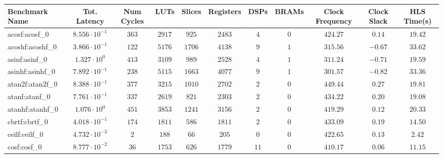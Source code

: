 \begin{tabular}{|l|c|c|c|c|c|c|c|c|c|c|}
\hline
Benchmark Name               & Tot. Latency            & Num Cycles & LUTs      & Slices    & Registers & DSPs    & BRAMs & Clock Frequency & Clock Slack & HLS Time(s) \\
\hline
acosf:acosf\_0               & $ 8.556 \cdot 10^{-1} $ & $ 363    $ & $ 2917  $ & $ 925   $ & $ 2483  $ & $ 4   $ & $ 0 $ & $ 424.27      $ & $ 0.14    $ & $ 19.42   $ \\
acoshf:acoshf\_0             & $ 3.866 \cdot 10^{-1} $ & $ 122    $ & $ 5176  $ & $ 1706  $ & $ 4138  $ & $ 9   $ & $ 1 $ & $ 315.56      $ & $ -0.67   $ & $ 33.62   $ \\
asinf:asinf\_0               & $ 1.327 \cdot 10^{0}  $ & $ 413    $ & $ 3109  $ & $ 989   $ & $ 2528  $ & $ 4   $ & $ 1 $ & $ 311.24      $ & $ -0.71   $ & $ 19.59   $ \\
asinhf:asinhf\_0             & $ 7.892 \cdot 10^{-1} $ & $ 238    $ & $ 5115  $ & $ 1663  $ & $ 4077  $ & $ 9   $ & $ 1 $ & $ 301.57      $ & $ -0.82   $ & $ 33.36   $ \\
atan2f:atan2f\_0             & $ 8.388 \cdot 10^{-1} $ & $ 377    $ & $ 3215  $ & $ 1010  $ & $ 2702  $ & $ 2   $ & $ 0 $ & $ 449.44      $ & $ 0.27    $ & $ 19.81   $ \\
atanf:atanf\_0               & $ 7.761 \cdot 10^{-1} $ & $ 337    $ & $ 2619  $ & $ 821   $ & $ 2303  $ & $ 2   $ & $ 0 $ & $ 434.22      $ & $ 0.20    $ & $ 19.08   $ \\
atanhf:atanhf\_0             & $ 1.076 \cdot 10^{0}  $ & $ 451    $ & $ 3853  $ & $ 1241  $ & $ 3156  $ & $ 2   $ & $ 0 $ & $ 419.29      $ & $ 0.12    $ & $ 20.33   $ \\
cbrtf:cbrtf\_0               & $ 4.018 \cdot 10^{-1} $ & $ 174    $ & $ 1811  $ & $ 586   $ & $ 1811  $ & $ 2   $ & $ 0 $ & $ 433.09      $ & $ 0.19    $ & $ 14.50   $ \\
ceilf:ceilf\_0               & $ 4.732 \cdot 10^{-3} $ & $ 2      $ & $ 188   $ & $ 66    $ & $ 205   $ & $ 0   $ & $ 0 $ & $ 422.65      $ & $ 0.13    $ & $ 2.42    $ \\
cosf:cosf\_0                 & $ 8.777 \cdot 10^{-2} $ & $ 36     $ & $ 1753  $ & $ 626   $ & $ 1779  $ & $ 11  $ & $ 0 $ & $ 410.17      $ & $ 0.06    $ & $ 11.15   $ \\

\end{tabular}
